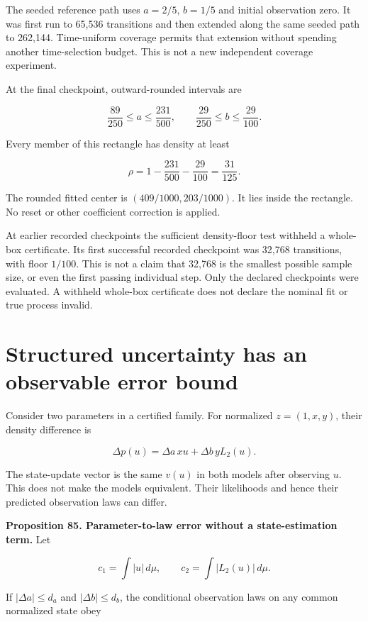 The seeded reference path uses \(a=2/5\), \(b=1/5\) and initial
observation zero. It was first run to 65,536 transitions and then
extended along the same seeded path to 262,144. Time-uniform coverage
permits that extension without spending another time-selection budget.
This is not a new independent coverage experiment.

At the final checkpoint, outward-rounded intervals are

\[
\boxed{
\frac{89}{250}\leq a\leq\frac{231}{500},
\qquad
\frac{29}{250}\leq b\leq\frac{29}{100}.
}
\]

Every member of this rectangle has density at least

\[
\rho=1-\frac{231}{500}-\frac{29}{100}=\frac{31}{125}.
\]

The rounded fitted center is \((409/1000,203/1000)\). It lies inside the
rectangle. No reset or other coefficient correction is applied.

At earlier recorded checkpoints the sufficient density-floor test
withheld a whole-box certificate. Its first successful recorded
checkpoint was 32,768 transitions, with floor \(1/100\). This is not a
claim that 32,768 is the smallest possible sample size, or even the
first passing individual step. Only the declared checkpoints were
evaluated. A withheld whole-box certificate does not declare the nominal
fit or true process invalid.

\section{Structured uncertainty has an observable error bound}\label{LSM:structured-uncertainty-has-an-observable-error-bound}

Consider two parameters in a certified family. For normalized
\(z=(1,x,y)\), their density difference is

\[
\Delta p(u)=\Delta a\,x u+\Delta b\,yL_2(u).
\]

The state-update vector is the same \(v(u)\) in both models after
observing \(u\). This does not make the models equivalent. Their
likelihoods and hence their predicted observation laws can differ.

\textbf{Proposition 85. Parameter-to-law error without a
state-estimation term.} Let

\[
c_1=\int|u|\,d\mu,
\qquad c_2=\int|L_2(u)|\,d\mu.
\]

If \(|\Delta a|\leq d_a\) and \(|\Delta b|\leq d_b\), the conditional
observation laws on any common normalized state obey

